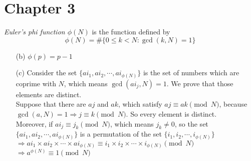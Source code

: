 \chapter*{Chapter 3}
\begin{exer}[3.4] \textit{Euler's phi function $\phi(N)$} is the function defined by \[\phi(N) = \#\{0 \leq k < N: \gcd(k, N)=1\}\]
	\begin{enumerate}
		\item [(b)] $\phi(p)=p-1$
		\item [(c)] Consider the set $\{ai_1, ai_2, \cdots, ai_{\phi(N)}\}$ is the set of numbers which are coprime with $N$, which means $\gcd(ai_j, N)=1$. We prove that those elements are distinct. \\ Suppose that there are $aj$ and $ak$, which satisfy $aj \equiv ak \pmod{N}$, because $\gcd(a, N)=1 \Rightarrow j \equiv k \pmod{N}$. So every element is distinct. \\ Moreover, if $ai_j \equiv j_k \pmod{N}$, which means $j_k \neq 0$, so the set $\{ai_1, ai_2, \cdots, ai_{\phi(N)}\}$ is a permutation of the set $\{i_1, i_2, \cdots, i_{\phi(N)}\}$ \\ $\Rightarrow ai_1 \times ai_2 \times \cdots \times ai_{\phi(N)} \equiv i_1 \times i_2 \times \cdots \times i_{\phi(N)} \pmod{N}$ \\ $\Rightarrow a^{\phi(N)} \equiv 1 \pmod{N}$
	\end{enumerate}
\end{exer}

